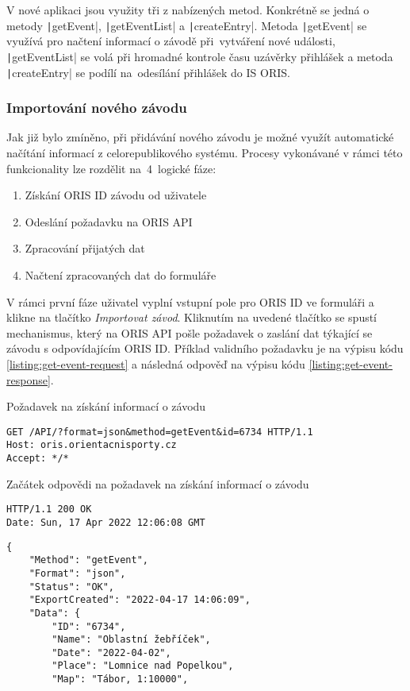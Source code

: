V nové aplikaci jsou využity tři z nabízených metod. Konkrétně se jedná o metody \texttt|getEvent|, \texttt|getEventList| a \texttt|createEntry|. Metoda \texttt|getEvent| se využívá pro načtení informací o závodě při~vytváření nové události, \texttt|getEventList| se volá při hromadné kontrole času uzávěrky přihlášek a metoda \texttt|createEntry| se podílí na~odesílání přihlášek do IS ORIS.

\subsubsection{Importování nového závodu}
Jak již bylo zmíněno, při přidávání nového závodu je možné využít automatické načítání informací z celorepublikového systému. Procesy vykonávané v rámci této funkcionality lze rozdělit na~4~logické fáze:
\begin{enumerate}
    \item Získání ORIS ID závodu od uživatele
    \item Odeslání požadavku na ORIS API
    \item Zpracování přijatých dat
    \item Načtení zpracovaných dat do formuláře
\end{enumerate}

V rámci první fáze uživatel vyplní vstupní pole pro ORIS ID ve formuláři a klikne na tlačítko \emph{Importovat závod}. Kliknutím na uvedené tlačítko se spustí mechanismus, který na ORIS API pošle požadavek o zaslání dat týkající se závodu s odpovídajícím ORIS ID. Příklad validního požadavku je na výpisu kódu \ref{listing:get-event-request} a následná odpověď na výpisu kódu \ref{listing:get-event-response}.

\begin{listing}[h]
    \caption{Požadavek na získání informací o závodu}\label{listing:get-event-request}
    \begin{verbatim}
GET /API/?format=json&method=getEvent&id=6734 HTTP/1.1
Host: oris.orientacnisporty.cz
Accept: */*
    \end{verbatim}
\end{listing}
\vspace{-3mm}

\begin{listing}[h]
    \caption{Začátek odpovědi na požadavek na získání informací o závodu}\label{listing:get-event-response}
    \begin{verbatim}
HTTP/1.1 200 OK
Date: Sun, 17 Apr 2022 12:06:08 GMT

    \end{verbatim}
    \vspace{-11mm}
    \begin{verbatim}
{
    "Method": "getEvent",
    "Format": "json",
    "Status": "OK",
    "ExportCreated": "2022-04-17 14:06:09",
    "Data": {
        "ID": "6734",
        "Name": "Oblastní žebříček",
        "Date": "2022-04-02",
        "Place": "Lomnice nad Popelkou",
        "Map": "Tábor, 1:10000",
    \end{verbatim}
\end{listing}

